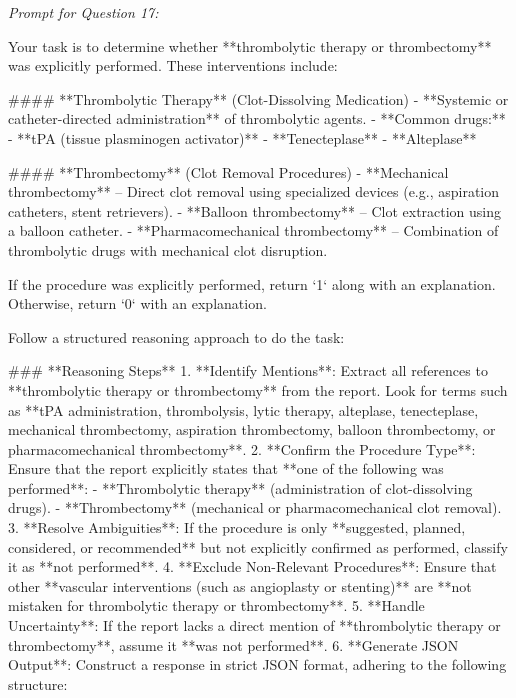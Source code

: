 \textit{\normalsize Prompt for Question  17:}
\begin{mdframed}[]
\normalsize

Your task is to determine whether **thrombolytic therapy or thrombectomy** was explicitly performed. These interventions include:  

#### **Thrombolytic Therapy** (Clot-Dissolving Medication)  
- **Systemic or catheter-directed administration** of thrombolytic agents.  
- **Common drugs:**  
  - **tPA (tissue plasminogen activator)**  
  - **Tenecteplase**  
  - **Alteplase**  

#### **Thrombectomy** (Clot Removal Procedures)  
- **Mechanical thrombectomy** – Direct clot removal using specialized devices (e.g., aspiration catheters, stent retrievers).  
- **Balloon thrombectomy** – Clot extraction using a balloon catheter.  
- **Pharmacomechanical thrombectomy** – Combination of thrombolytic drugs with mechanical clot disruption.  

If the procedure was explicitly performed, return `1` along with an explanation. Otherwise, return `0` with an explanation.

Follow a structured reasoning approach to do the task:

### **Reasoning Steps**  
1. **Identify Mentions**: Extract all references to **thrombolytic therapy or thrombectomy** from the report. Look for terms such as **tPA administration, thrombolysis, lytic therapy, alteplase, tenecteplase, mechanical thrombectomy, aspiration thrombectomy, balloon thrombectomy, or pharmacomechanical thrombectomy**.  
2. **Confirm the Procedure Type**: Ensure that the report explicitly states that **one of the following was performed**:  
   - **Thrombolytic therapy** (administration of clot-dissolving drugs).  
   - **Thrombectomy** (mechanical or pharmacomechanical clot removal).  
3. **Resolve Ambiguities**: If the procedure is only **suggested, planned, considered, or recommended** but not explicitly confirmed as performed, classify it as **not performed**.  
4. **Exclude Non-Relevant Procedures**: Ensure that other **vascular interventions (such as angioplasty or stenting)** are **not mistaken for thrombolytic therapy or thrombectomy**.  
5. **Handle Uncertainty**: If the report lacks a direct mention of **thrombolytic therapy or thrombectomy**, assume it **was not performed**.  
6. **Generate JSON Output**: Construct a response in strict JSON format, adhering to the following structure:  

\end{mdframed}

